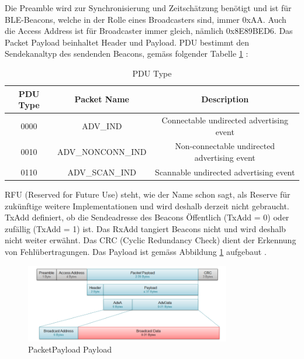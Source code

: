 Die Preamble wird zur Synchronisierung und Zeitschätzung benötigt und ist für BLE-Beacons, welche in der Rolle eines Broadcasters sind, immer 0xAA. Auch die Access Address ist für Broadcaster immer gleich, nämlich 0x8E89BED6. Das Packet Payload beinhaltet Header und Payload. PDU bestimmt den Sendekanaltyp des sendenden Beacons, gemäss folgender Tabelle \ref{tab:PDU} \cite{9_Teildokument_BT}:

\begin{table}[htbp!!!]
\begin{tabular}{|c|c|c|}
\hline 
\rule[-1ex]{0pt}{2.5ex} PDU Type & Packet Name & Description \\ 
\hline 
\rule[-1ex]{0pt}{2.5ex} 0000 & ADV{\_}IND & Connectable undirected advertising event \\ 
\hline 
\rule[-1ex]{0pt}{2.5ex} 0010 & ADV{\_}NONCONN{\_}IND & Non-connectable undirected advertising event \\ 
\hline 
\rule[-1ex]{0pt}{2.5ex} 0110 & ADV{\_}SCAN{\_}IND & Scannable undirected advertising event \\ 
\hline 
\end{tabular} 
\caption[PDU Type]{PDU Type}
\label{tab:PDU}
\end{table}

RFU (Reserved for Future Use) steht, wie der Name schon sagt, als Reserve für zukünftige weitere Implementationen und wird deshalb derzeit nicht gebraucht. TxAdd definiert, ob die Sendeadresse des Beacons Öffentlich (TxAdd = 0) oder zufällig (TxAdd = 1) ist. Das RxAdd tangiert Beacons nicht und wird deshalb nicht weiter erwähnt. Das CRC (Cyclic Redundancy Check) dient der Erkennung von Fehlübertragungen. Das Payload ist gemäss Abbildung \ref{fig:PacketPayload_Payload} aufgebaut \cite{9_Teildokument_BT}.

\begin{figure}[htbp!!!!]
	\begin{center}
		\includegraphics[width=0.8\textwidth]{data/PacketPayload_Payload.png}
		\caption[PacketPayload Payload]{PacketPayload Payload} %
		\label{fig:PacketPayload_Payload}
	\end{center}
\end{figure}

